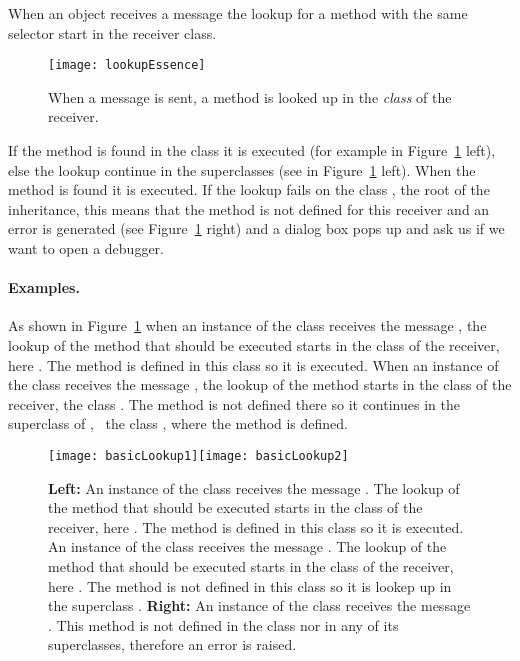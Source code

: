 When an object receives a message the  lookup for a method with the same selector start in the receiver class. 

\begin{figure}[ht]
\begin{center}
\texttt{[image: lookupEssence]}
\caption{When a message is sent, a method is looked up in the \emph{class} of the receiver.}
\end{center}
\end{figure}


If the method is found in the class it is executed (for example  in Figure~\ref{fig:basicLookup1} left), else the lookup continue in the superclasses (see  in Figure~\ref{fig:basicLookup1} left). When the method is found it is executed. If the lookup fails on the class \obj, the root of the inheritance, this means that the method is not defined for this receiver and an error is generated (see Figure~\ref{fig:basicLookup1} right) and a dialog box pops up and ask us if we want to open a debugger. 

\paragraph{Examples.}
As shown in Figure~\ref{fig:basicLookup1} when an instance of the class  receives the message , the lookup of the method that should be executed starts in the class of the receiver, here . The method is defined in this class so it is executed. 
When an instance of the class  receives the message , the lookup of the method  starts in the class of the receiver, the class . The method is not defined there so it continues in the superclass of , \ie\ the class , where the method  is defined.

\begin{figure}[ht]
\centerline{\texttt{[image: basicLookup1]}\texttt{[image: basicLookup2]}}
\caption{\textbf{Left:} An instance of the class  receives the message . The lookup of the method that should be executed starts in the class of the receiver, here . The method is defined in this class so it is executed. An instance of the class  receives the message . The lookup of the method that should be executed starts in the class of the receiver, here . The method is not defined in this class so it is lookep up in the superclass . 
\textbf{Right:} An instance of the class  receives the message . This method is not defined in the class  nor in any of its superclasses, therefore an error is raised.\label{fig:basicLookup1}}
\end{figure}


